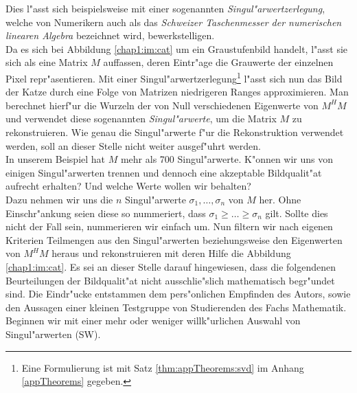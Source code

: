 
Dies l"asst sich beispielsweise mit einer sogenannten \emph{Singul"arwertzerlegung}, welche von Numerikern auch als das \emph{Schweizer Taschenmesser der numerischen linearen Algebra} bezeichnet wird, bewerkstelligen.\\

Da es sich bei Abbildung \ref{chap1:im:cat} um ein Graustufenbild handelt, l"asst sie sich als eine Matrix $M$ auffassen, deren Eintr"age die Grauwerte der einzelnen Pixel repr"asentieren.
Mit einer Singul"arwertzerlegung\footnote{Eine Formulierung ist mit Satz \ref{thm:appTheorems:svd} im Anhang \ref{appTheorems} gegeben.} l"asst sich nun das Bild der Katze durch eine Folge von Matrizen niedrigeren Ranges approximieren.
Man berechnet hierf"ur die Wurzeln der von Null verschiedenen Eigenwerte von $M^H M$ und verwendet diese sogenannten \emph{Singul"arwerte}, um die Matrix $M$ zu rekonstruieren. Wie genau die Singul"arwerte f"ur die Rekonstruktion verwendet werden, soll an dieser Stelle nicht weiter ausgef"uhrt werden.\\

In unserem Beispiel hat $M$ mehr als 700 Singul"arwerte. K"onnen wir uns von einigen Singul"arwerten trennen und dennoch eine akzeptable Bildqualit"at aufrecht erhalten? Und welche Werte wollen wir behalten?\\

Dazu nehmen wir uns die $n$ Singul"arwerte $\sigma_1,\ldots,\sigma_n$ von $M$ her. Ohne Einschr"ankung seien diese so nummeriert, dass $\sigma_1 \ge \ldots \ge \sigma_n$ gilt. Sollte dies nicht der Fall sein, nummerieren wir einfach um.
Nun filtern wir nach eigenen Kriterien Teilmengen aus den Singul"arwerten beziehungsweise den Eigenwerten von $M^H M$ heraus und rekonstruieren mit deren Hilfe die Abbildung \ref{chap1:im:cat}.
Es sei an dieser Stelle darauf hingewiesen, dass die folgendenen Beurteilungen der Bildqualit"at nicht ausschlie"slich mathematisch begr"undet sind.
Die Eindr"ucke entstammen dem pers"onlichen Empfinden des Autors, sowie den Aussagen einer kleinen Testgruppe von Studierenden des Fachs Mathematik.\\

Beginnen wir mit einer mehr oder weniger willk"urlichen Auswahl von Singul"arwerten (SW).

